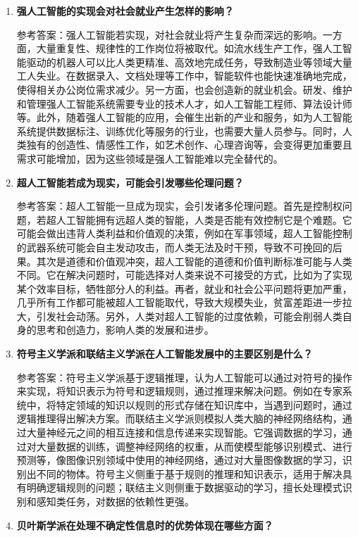 \begin{enumerate}
\item \textbf{强人工智能的实现会对社会就业产生怎样的影响？}

参考答案：强人工智能若实现，对社会就业将产生复杂而深远的影响。一方面，大量重复性、规律性的工作岗位将被取代。如流水线生产工作，强人工智能驱动的机器人可以比人类更精准、高效地完成任务，导致制造业等领域大量工人失业。在数据录入、文档处理等工作中，智能软件也能快速准确地完成，使得相关办公岗位需求减少。另一方面，也会创造新的就业机会。研发、维护和管理强人工智能系统需要专业的技术人才，如人工智能工程师、算法设计师等。此外，随着强人工智能的应用，会催生出新的产业和服务，如为人工智能系统提供数据标注、训练优化等服务的行业，也需要大量人员参与。同时，人类独有的创造性、情感性工作，如艺术创作、心理咨询等，会变得更加重要且需求可能增加，因为这些领域是强人工智能难以完全替代的。

\item \textbf{超人工智能若成为现实，可能会引发哪些伦理问题？}

参考答案：超人工智能一旦成为现实，会引发诸多伦理问题。首先是控制权问题，若超人工智能拥有远超人类的智能，人类是否能有效控制它是个难题。它可能会做出违背人类利益和价值观的决策，例如在军事领域，超人工智能控制的武器系统可能会自主发动攻击，而人类无法及时干预，导致不可挽回的后果。其次是道德和价值观冲突，超人工智能的道德和价值判断标准可能与人类不同。它在解决问题时，可能选择对人类来说不可接受的方式，比如为了实现某个效率目标，牺牲部分人的利益。再者，就业和社会公平问题将更加严重，几乎所有工作都可能被超人工智能取代，导致大规模失业，贫富差距进一步拉大，引发社会动荡。另外，人类对超人工智能的过度依赖，可能会削弱人类自身的思考和创造力，影响人类的发展和进步。

\item \textbf{符号主义学派和联结主义学派在人工智能发展中的主要区别是什么？}

参考答案：符号主义学派基于逻辑推理，认为人工智能可以通过对符号的操作来实现，将知识表示为符号和逻辑规则，通过推理来解决问题。例如在专家系统中，将特定领域的知识以规则的形式存储在知识库中，当遇到问题时，通过逻辑推理得出解决方案。而联结主义学派则模拟人类大脑的神经网络结构，通过大量神经元之间的相互连接和信息传递来实现智能。它强调数据的学习，通过对大量数据的训练，调整神经网络的权重，从而使模型能够识别模式、进行预测等，像图像识别领域中使用的神经网络，通过对大量图像数据的学习，识别出不同的物体。符号主义侧重于基于规则的推理和知识表示，适用于解决具有明确逻辑规则的问题；联结主义则侧重于数据驱动的学习，擅长处理模式识别和感知类任务，对数据的依赖性更强。

\item \textbf{贝叶斯学派在处理不确定性信息时的优势体现在哪些方面？}


\end{enumerate}

